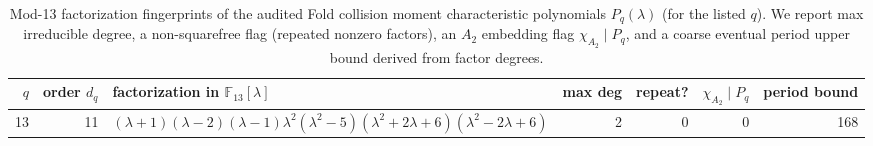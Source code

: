 \begin{table}[H]
\centering
\scriptsize
\setlength{\tabcolsep}{5pt}
\caption{Mod-13 factorization fingerprints of the audited Fold collision moment characteristic polynomials $P_q(\lambda)$ (for the listed $q$). We report max irreducible degree, a non-squarefree flag (repeated nonzero factors), an $A_2$ embedding flag $\chi_{A_2}\mid P_q$, and a coarse eventual period upper bound derived from factor degrees.}
\label{tab:fold_collision_charpoly_mod13_fingerprint_q13}
\begin{tabular}{r r l r r r r}
\toprule
$q$ & order $d_q$ & factorization in $\mathbb{F}_{13}[\lambda]$ & max deg & repeat? & $\chi_{A_2}\mid P_q$ & period bound\\
\midrule
13 & 11 & $\left(\lambda + 1\right) \left(\lambda - 2\right) \left(\lambda - 1\right) \lambda^{2} \left(\lambda^{2} - 5\right) \left(\lambda^{2} + 2\lambda + 6\right) \left(\lambda^{2} - 2\lambda + 6\right)$ & 2 & 0 & 0 & 168\\
\bottomrule
\end{tabular}
\end{table}
